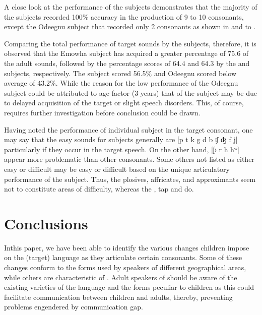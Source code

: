 \documentclass[output=paper,
modfonts
]{langscibook}
\begin{document}
A close look at the performance of the subjects demonstrates that the majority of the subjects recorded 100\% accuracy in the production of 9 to 10 consonants, except the Odeegnu subject that recorded only 2 consonants as shown in  and  to .

Comparing the total performance of target sounds by the subjects, therefore, it is observed that the Emowha subject has acquired a greater percentage of 75.6 of the adult sounds, followed by the percentage scores of 64.4 and 64.3 by the  and  subjects, respectively. The  subject scored 56.5\% and Odeegnu scored below average of 43.2\%. While the reason for the low performance of the Odeegnu subject could be attributed to age factor (3 years) that of the  subject may be due to delayed acquisition of the target or slight speech disorders. This, of course, requires further investigation before conclusion could be drawn.

\newpage 
Having noted the performance of individual subject in the target consonant, one may say that the easy sounds for  subjects generally are [p t k g d b ʧ ʤ f j] particularly if they occur in the target speech. On the other hand, [ƥ r h hʷ] appear more problematic than other consonants. Some others not listed as either easy or difficult may be easy or difficult based on the unique articulatory performance of the subject. Thus, the plosives, affricates,  and approximants seem not to constitute areas of difficulty, whereas the , tap and   do. 

\section{Conclusions}\label{sec:alerechi:4}

Inthis paper, we have been able to identify the various changes children impose on the  (target) language as they articulate certain consonants. Some of these changes conform to the forms used by speakers of different geographical areas, while others are characteristic of . Adult speakers of  should be aware of the existing varieties of the language and the forms peculiar to children as this could facilitate communication between children and adults, thereby, preventing problems engendered by communication gap.
 
 
{\sloppy
\printbibliography[heading=subbibliography,notkeyword=this]
}
\end{document}
